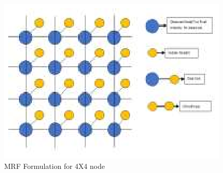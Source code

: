 \documentclass{singlecol-new}
\theoremstyle{TH}{
\newtheorem{lemma}{Lemma}
\newtheorem{theorem}[lemma]{Theorem}
\newtheorem{corrolary}[lemma]{Corrolary}
\newtheorem{conjecture}[lemma]{Conjecture}
\newtheorem{proposition}[lemma]{Proposition}
\newtheorem{claim}[lemma]{Claim}
\newtheorem{stheorem}[lemma]{Wrong Theorem}
\newtheorem{algorithm}{Algorithm}
}
\theoremstyle{THrm}{
\newtheorem{definition}{Definition}[section]
\newtheorem{question}{Question}[section]
\newtheorem{remark}{Remark}
\newtheorem{scheme}{Scheme}
}
\theoremstyle{THhit}{
\newtheorem{case}{Case}[section]
}
\begin{document}
\begin{figure}[t]%
\includegraphics{mrf3.eps}
\caption{MRF Formulation for 4X4 node}
\label{fig:editpublish}
\end{figure}
\end{document}
